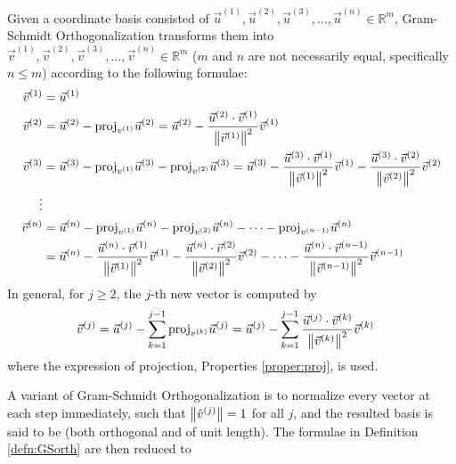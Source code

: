 \begin{defn}
\label{defn:GSorth}
Given a coordinate basis consisted of $\vec{u}^{(1)}, \vec{u}^{(2)}, \vec{u}^{(3)}, \ldots, \vec{u}^{(n)} \in \mathbb{R}^m$, Gram-Schmidt Orthogonalization transforms them into $\vec{v}^{(1)}, \vec{v}^{(2)}, \vec{v}^{(3)}, \ldots, \vec{v}^{(n)} \in \mathbb{R}^m$ ($m$ and $n$ are not necessarily equal, specifically $n \leq m$) according to the following formulae:
\begin{align*}
\vec{v}^{(1)} &= \vec{u}^{(1)} \\
\vec{v}^{(2)} &= \vec{u}^{(2)} - \text{proj}_{v^{(1)}}\vec{u}^{(2)} = \vec{u}^{(2)} - \frac{\vec{u}^{(2)} \cdot \vec{v}^{(1)}}{\norm{\vec{v}^{(1)}}^2} \vec{v}^{(1)} \\
\vec{v}^{(3)} &= \vec{u}^{(3)} - \text{proj}_{v^{(1)}}\vec{u}^{(3)} - \text{proj}_{v^{(2)}}\vec{u}^{(3)} = \vec{u}^{(3)} - \frac{\vec{u}^{(3)} \cdot \vec{v}^{(1)}}{\norm{\vec{v}^{(1)}}^2} \vec{v}^{(1)} - \frac{\vec{u}^{(3)} \cdot \vec{v}^{(2)}}{\norm{\vec{v}^{(2)}}^2} \vec{v}^{(2)} \\
\vdots \\
\vec{v}^{(n)} &= \vec{u}^{(n)} - \text{proj}_{v^{(1)}}\vec{u}^{(n)} - \text{proj}_{v^{(2)}}\vec{u}^{(n)} - \cdots - \text{proj}_{v^{(n-1)}}\vec{u}^{(n)} \\
&= \vec{u}^{(n)} - \frac{\vec{u}^{(n)} \cdot \vec{v}^{(1)}}{\norm{\vec{v}^{(1)}}^2} \vec{v}^{(1)} - \frac{\vec{u}^{(n)} \cdot \vec{v}^{(2)}}{\norm{\vec{v}^{(2)}}^2} \vec{v}^{(2)} - \cdots - \frac{\vec{u}^{(n)} \cdot \vec{v}^{(n-1)}}{\norm{\vec{v}^{(n-1)}}^2} \vec{v}^{(n-1)}
\end{align*}
In general, for $j \geq 2$, the $j$-th new vector is computed by
\begin{align*}
\vec{v}^{(j)} &= \vec{u}^{(j)} - \sum_{k=1}^{j-1}\text{proj}_{v^{(k)}}\vec{u}^{(j)}  = \vec{u}^{(j)} - \sum_{k=1}^{j-1}\frac{\vec{u}^{(j)} \cdot \vec{v}^{(k)}}{\norm{\vec{v}^{(k)}}^2} \vec{v}^{(k)}
\end{align*}
where the expression of projection, Properties \ref{proper:proj}, is used.
\end{defn}
A variant of Gram-Schmidt Orthogonalization is to normalize every vector at each step immediately, such that $\norm{\hat{v}^{(j)}} = 1$ for all $j$, and the resulted basis is said to be  (both orthogonal and of unit length). The formulae in Definition \ref{defn:GSorth} are then reduced to
